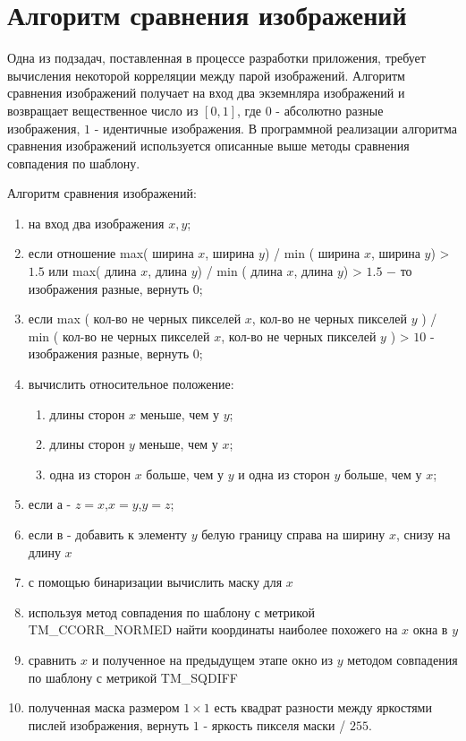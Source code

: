 \documentclass[oneside,final,14pt]{extreport}
\begin{document}
\section{Алгоритм сравнения изображений}
Одна из подзадач, поставленная в процессе разработки приложения, требует вычисления некоторой корреляции между парой изображений.  Алгоритм сравнения изображений получает на вход два экземнляра изображений и возвращает вещественное число из $[0,1]$, где $0$ - абсолютно разные изображения, $1$ - идентичные изображения.  В программной реализации алгоритма сравнения изображений используется описанные выше методы сравнения совпадения по шаблону.

Алгоритм сравнения изображений:

\begin{enumerate}%
\item на вход два изображения $x, y$;
\item если отношение max( ширина $x$, ширина $y$) / min ( ширина $x$, ширина $y$) > $1.5$ или max( длина $x$, длина $y$) / min ( длина $x$, длина $y$) > $1.5$ $-$ то изображения разные, вернуть $0$;
\item если  max ( кол-во не черных пикселей $x$,  кол-во не черных пикселей $y$ ) / min ( кол-во не черных пикселей $x$,  кол-во не черных пикселей $y$ ) > $10$ - изображения разные, вернуть $0$;
\item вычислить относительное положение: 

\begin{enumerate}%
\item длины сторон $x$ меньше, чем у $y$;
\item длины сторон $y$ меньше, чем у $x$;
\item одна из сторон $x$ больше, чем у $y$ и одна из сторон $y$ больше, чем у $x$;
\end{enumerate}

\item если а - $z = x$,$x = y$,$y = z$;
\item если в - добавить к элементу $y$ белую границу справа на ширину $x$, снизу на длину $x$
\item с помощью бинаризации вычислить маску для $x$
\item используя метод совпадения по шаблону с метрикой TM\_CCORR\_NORMED найти координаты наиболее похожего на $x$ окна в $y$
\item сравнить $x$ и полученное на предыдущем этапе окно из $y$ методом совпадения по шаблону с метрикой TM\_SQDIFF
\item полученная маска размером $1 \times 1$ есть квадрат разности между яркостями пислей изображения, вернуть $1$ - яркость пикселя маски / $255$.
\end{enumerate}
\end{document}
